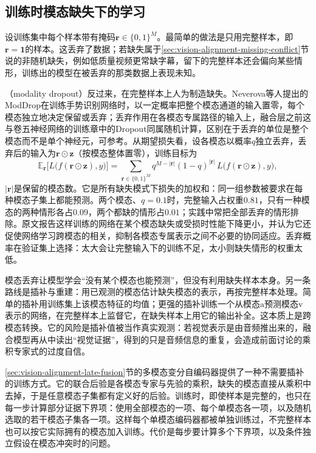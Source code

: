 \subsection{训练时模态缺失下的学习}
\label{sec:vision-alignment-missing-training}

设训练集中每个样本带有掩码$\bm r\in\{0,1\}^M$。最简单的做法是只用完整样本，即$\bm r=\bm 1$的样本。这丢弃了数据；若缺失属于\ref{sec:vision-alignment-missing-conflict}节说的非随机缺失，例如低质量视频更常缺字幕，留下的完整样本还会偏向某些情形，训练出的模型在被丢弃的那类数据上表现未知。

（modality dropout）反过来，在完整样本上人为制造缺失。Neverova等人提出的ModDrop在训练手势识别网络时，以一定概率把整个模态通道的输入置零，每个模态独立地决定保留或丢弃；丢弃作用在各模态专属路径的输入上，融合层之前这与卷五神经网络的训练章中的Dropout同属随机计算，区别在于丢弃的单位是整个模态而不是单个神经元，可参考。从期望损失看，设各模态以概率$q$独立丢弃，丢弃后的输入为$\bm r\odot\bm z$（按模态整体置零），训练目标为
\begin{equation}
  \mathbb E_{\bm r}\bigl[L\bigl(f(\bm r\odot\bm z),y\bigr)\bigr]
  =\sum_{\bm r\in\{0,1\}^M}q^{M-\lvert\bm r\rvert}(1-q)^{\lvert\bm r\rvert}\,
   L\bigl(f(\bm r\odot\bm z),y\bigr),
  \label{eq:vision-alignment-moddrop}
\end{equation}
$\lvert\bm r\rvert$是保留的模态数。它是所有缺失模式下损失的加权和：同一组参数被要求在每种模态子集上都能预测。两个模态、$q=0.1$时，完整输入占权重$0.81$，只有一种模态的两种情形各占$0.09$，两个都缺的情形占$0.01$；实践中常把全部丢弃的情形排除。原文报告这样训练的网络在某个模态缺失或受损时性能下降更小，并认为它还促使网络学习跨模态的相关，抑制各模态专属表示之间不必要的协同适应。丢弃概率在验证集上选择：太大会让完整输入下的训练不足，太小则缺失情形的权重太低。

模态丢弃让模型学会“没有某个模态也能预测”，但没有利用缺失样本本身。另一条路线是插补与重建：用已观测的模态估计缺失模态的表示，再按完整样本处理。简单的插补用训练集上该模态特征的均值；更强的插补训练一个从模态$\mathrm a$预测模态$\mathrm v$表示的网络，在完整样本上监督它，在缺失样本上用它的输出补全。这本质上是跨模态转换。它的风险是插补值被当作真实观测：若视觉表示是由音频推出来的，融合模型再从中读出“视觉证据”，得到的只是音频信息的重复，会造成前面讨论的乘积专家式的过度自信。

\ref{sec:vision-alignment-late-fusion}节的多模态变分自编码器提供了一种不需要插补的训练方式。它的联合后验是各模态专家与先验的乘积，缺失的模态直接从乘积中去掉，于是任意模态子集都有定义好的后验。训练时，即使样本是完整的，也只在每一步计算部分证据下界项：使用全部模态的一项、每个单模态各一项，以及随机选取的若干模态子集各一项。这样每个单模态编码器都被单独训练过，不完整样本也可以按它实际拥有的模态加入训练。代价是每步要计算多个下界项，以及条件独立假设在模态冲突时的问题。

